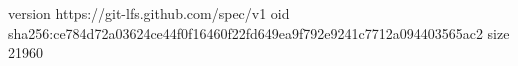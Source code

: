 version https://git-lfs.github.com/spec/v1
oid sha256:ce784d72a03624ce44f0f16460f22fd649ea9f792e9241c7712a094403565ac2
size 21960
